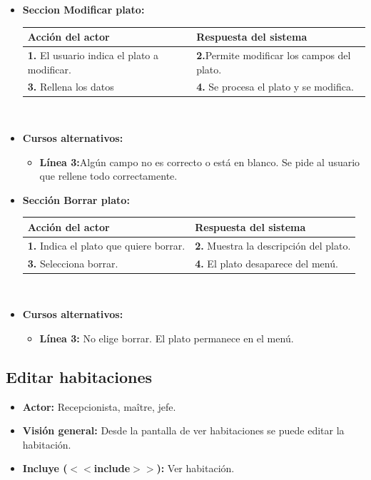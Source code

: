 \documentclass[spanish,a4paper,11pt, twoside]{report}	%
\begin{document}
\begin{itemize}
			\item \textbf{Seccion Modificar plato:} 	\\
				\begin{tabular}{|p{6cm}||p{6cm}|}
				\hline
				\textbf{Acción del actor} & \textbf{Respuesta del sistema} \\ \hline \hline
				\textbf{1.} El usuario indica el plato a modificar. & 
				\textbf{2.}Permite modificar los campos del plato. \\ \hline
				\textbf{3.} Rellena los datos	& 
				\textbf{4.} Se procesa el plato y se modifica. \\ \hline
			\end{tabular}
			\\
			\item \textbf{Cursos alternativos:} 
			\begin{itemize}
				\item  \textbf{Línea 3:}Algún campo no es correcto o está en blanco. Se pide al usuario que rellene todo correctamente.

			\end {itemize}
			
			\item \textbf{Sección Borrar plato:} 	\\
				\begin{tabular}{|p{6cm}||p{6cm}|}
				\hline
				\textbf{Acción del actor} & \textbf{Respuesta del sistema} \\ \hline \hline
				\textbf{1.} Indica el plato que quiere borrar. & 
				\textbf{2.} Muestra la descripción del plato.\\ \hline 
				\textbf{3.} Selecciona borrar. & 
				\textbf{4.} El plato desaparece del menú. \\ \hline
			\end{tabular}
			\\
			\item \textbf{Cursos alternativos:} 
			\begin{itemize}
				\item  \textbf{Línea 3:} No elige borrar. El plato permanece en el menú.
			\end {itemize}
		\end {itemize}



	\subsection{Editar habitaciones}
		\begin{itemize}
			\item \textbf{Actor:} Recepcionista, maître, jefe.
			\item \textbf{Visión general:} Desde la pantalla de ver habitaciones se puede editar la habitación.	
			\item \textbf{Incluye ($<<$include$>>$):} Ver habitación.
		\end {itemize}
\end{document}
